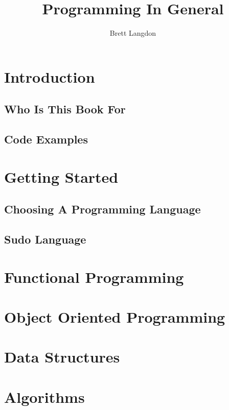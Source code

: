 \documentclass[10pt,a4paper,titlepage]{book}
\author{Brett Langdon}
\title{Programming In General}
\begin{document}
\maketitle
\tableofcontents

\chapter{Introduction}


\section{Who Is This Book For}


\section{Code Examples}


\chapter{Getting Started}


\section{Choosing A Programming Language}


\section{Sudo Language}


\chapter{Functional Programming}


\chapter{Object Oriented Programming}


\chapter{Data Structures}


\chapter{Algorithms}

\end{document}
